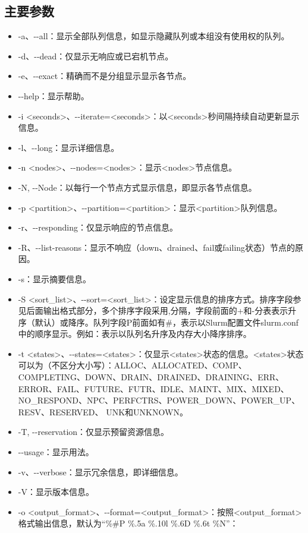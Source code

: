 \subsection{主要参数}
\begin{itemize}
	\item -a、-{}-all：显示全部队列信息，如显示隐藏队列或本组没有使用权的队列。
	\item -d、-{}-dead：仅显示无响应或已宕机节点。
	\item -e、-{}-exact：精确而不是分组显示显示各节点。
	\item -{}-help：显示帮助。
	\item -i <seconds>、-{}-iterate=<seconds>：以<seconds>秒间隔持续自动更新显示信息。
	\item -l、-{}-long：显示详细信息。
	\item -n <nodes>、-{}-nodes=<nodes>：显示<nodes>节点信息。
	\item -N, -{}-Node：以每行一个节点方式显示信息，即显示各节点信息。
	\item -p <partition>、-{}-partition=<partition>：显示<partition>队列信息。
	\item -r、-{}-responding：仅显示响应的节点信息。
	\item -R、-{}-list-reasons：显示不响应（down、drained、fail或failing状态）节点的原因。
	\item -s：显示摘要信息。
	\item -S <sort\_list>、-{}-sort=<sort\_list>：设定显示信息的排序方式。排序字段参见后面输出格式部分，多个排序字段采用,分隔，字段前面的+和-分表表示升序（默认）或降序。队列字段P前面如有\#，表示以Slurm配置文件slurm.conf中的顺序显示。例如：表示以队列名升序及内存大小降序排序。
	\item -t <states>、-{}-states=<states>：仅显示<states>状态的信息。<states>状态可以为（不区分大小写）：ALLOC、ALLOCATED、COMP、COMPLETING、DOWN、DRAIN、DRAINED、DRAINING、ERR、ERROR、FAIL、FUTURE、FUTR、IDLE、MAINT、MIX、MIXED、NO\_RESPOND、NPC、PERFCTRS、POWER\_DOWN、POWER\_UP、RESV、RESERVED、 UNK和UNKNOWN。
	\item -T, -{}-reservation：仅显示预留资源信息。
	\item -{}-usage：显示用法。
	\item -v、-{}-verbose：显示冗余信息，即详细信息。
	\item -V：显示版本信息。
	\item -o <output\_format>、-{}-format=<output\_format>：按照<output\_format>格式输出信息，默认为``\%\#P \%.5a \%.10l \%.6D \%.6t \%N''：
\begin{itemize}

\end{itemize}
\end{itemize}
